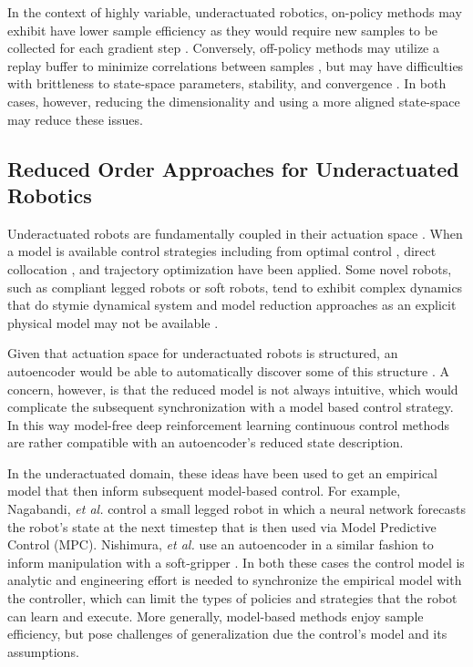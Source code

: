 \documentclass[letterpaper, 10 pt, conference]{ieeeconf}
\begin{document}
In the context of highly variable, underactuated robotics, on-policy methods may exhibit have lower sample efficiency as they would require new samples to be collected for each gradient step \cite{SAC}.   Conversely, off-policy methods may utilize a replay buffer to minimize correlations between samples \cite{DDPG}, but may have difficulties with brittleness to state-space parameters, stability, and convergence \cite{bhatnagar2009convergent}.  In both cases, however, reducing the dimensionality and using a more aligned state-space may reduce these issues. 


\subsection{Reduced Order Approaches for Underactuated Robotics}

Underactuated robots are fundamentally coupled in their actuation space  \cite{tedrake2019underactuated}.
When a model is available control strategies including from optimal control \cite{betts2010practical}, direct collocation \cite{von1993numerical}, and trajectory optimization \cite{kalakrishnan2011stomp} have been applied.
Some novel robots, such as compliant legged robots or soft robots, tend to exhibit complex dynamics that do stymie dynamical system and model reduction approaches as an explicit physical model may not be available \cite{nakajima2015information}.

Given that actuation space for underactuated robots is structured, an autoencoder would be able to automatically discover some of this structure \cite{AE_hinton2006reducing, ngsparse}.
A concern, however, is that the reduced model is not always intuitive, which would complicate the subsequent synchronization with a model based control strategy.
In this way model-free deep reinforcement learning continuous control methods are rather compatible with an autoencoder's reduced state description.


In the underactuated domain, these ideas have been used to get an empirical model that then inform subsequent model-based control.  For example, Nagabandi, \emph{et al.} \cite{nagabandi2018learning} control a small legged robot in which a neural network forecasts the robot's state at the next timestep that is then used via Model Predictive Control (MPC).  Nishimura, \emph{et al.} use an autoencoder in a similar fashion to inform manipulation with a soft-gripper \cite{nishimura2017thin}.  In both these cases the control model is analytic and engineering effort is needed to synchronize the empirical model with the controller, which can limit the types of policies and strategies that the robot can learn and execute.  
More generally, model-based methods enjoy sample efficiency, but pose challenges of generalization due the control's model and its assumptions.  
\end{document}
